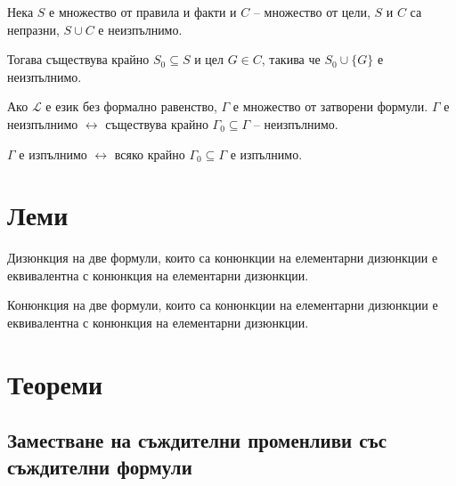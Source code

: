 \documentclass{article}
\def\Theorems{1}
\def\Lemmas{1}
\begin{document}
\begin{claim}
Нека $S$ е множество от правила и факти и $C$ -- множество от цели, $S$ и $C$ са непразни, $S \cup C$ е неизпълнимо.

Тогава съществува крайно $S_0 \subseteq S$ и цел $G \in C$, такива че $S_0 \cup \{G\}$ е неизпълнимо.
\end{claim}

\begin{claim}
Ако $\mathcal{L}$ е език без формално равенство, $\Gamma$ е множество от затворени формули. $\Gamma$ е неизпълнимо $\longleftrightarrow$ съществува крайно $\Gamma_0 \subseteq \Gamma$ -- неизпълнимо.
\end{claim}

\begin{claim}
$\Gamma$ е изпълнимо $\longleftrightarrow$ всяко крайно $\Gamma_0 \subseteq \Gamma$ е изпълнимо.
\end{claim}

\newpage
\fi

\ifcase\Lemmas\or
\section*{Леми}

\begin{lem}
Дизюнкция на две формули, които са конюнкции на елементарни дизюнкции е еквивалентна с конюнкция на елементарни дизюнкции.
\end{lem}

\begin{lem}
Конюнкция на две формули, които са конюнкции на елементарни дизюнкции е еквивалентна с конюнкция на елементарни дизюнкции.
\end{lem}

\newpage
\fi

\ifcase\Theorems\or
\section*{Теореми}

\subsection*{Заместване на съждителни променливи със съждителни формули}
\end{document}
